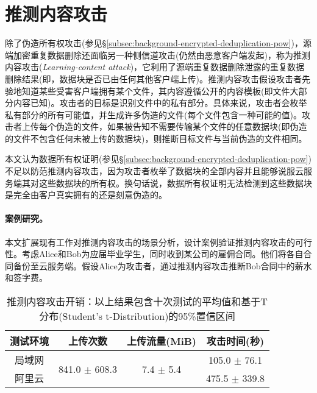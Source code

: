 \section{推测内容攻击}
\label{sec:featurespy-attack}

除了伪造所有权攻击(参见\S\ref{subsec:background-encrypted-deduplication-pow})，源端加密重复数据删除还面临另一种侧信道攻击(仍然由恶意客户端发起)，称为推测内容攻击(\textit{Learning-content attack})，它利用了源端重复数据删除泄露的重复数据删除结果(即，数据块是否已由任何其他客户端上传)。推测内容攻击假设攻击者先验地知道某些受害客户端拥有某个文件，其内容遵循公开的内容模板(即文件大部分内容已知)。攻击者的目标是识别文件中的私有部分。具体来说，攻击者会枚举私有部分的所有可能值，并生成许多伪造的文件(每个文件包含一种可能的值)。攻击者上传每个伪造的文件，如果被告知不需要传输某个文件的任意数据块(即伪造的文件不包含任何未被上传的数据块)，则推断目标文件与当前伪造的文件相同。

本文认为数据所有权证明(参见\S\ref{subsec:background-encrypted-deduplication-pow})不足以防范推测内容攻击，因为攻击者枚举了数据块的全部内容并且能够说服云服务端其对这些数据块的所有权。换句话说，数据所有权证明无法检测到这些数据块是完全由客户真实拥有的还是刻意伪造的。

\paragraph*{案例研究。}
本文扩展现有工作对推测内容攻击的场景分析，设计案例验证推测内容攻击的可行性。考虑Alice和Bob为应届毕业学生，同时收到某公司的雇佣合同。他们将各自合同备份至云服务端。假设Alice为攻击者，通过推测内容攻击推断Bob合同中的薪水和签字费。

\begin{table}[!htb]
    \small
    \centering
    \begin{tabular}{@{}cccc@{}}
        \toprule
        测试环境 & 上传次数                           & 上传流量(MiB)                  & 攻击时间(秒)      \\ \midrule
        局域网   & \multirow{2}{*}{841.0 $\pm$ 608.3} & \multirow{2}{*}{7.4 $\pm$ 5.4} & 105.0 $\pm$ 76.1  \\
        阿里云   &                                    &                                & 475.5 $\pm$ 339.8 \\
        \bottomrule
    \end{tabular}
    \caption{推测内容攻击开销：以上结果包含十次测试的平均值和基于T分布(Student's t-Distribution)的95\%置信区间}
    \label{tab:LRI-verify}
\end{table}

